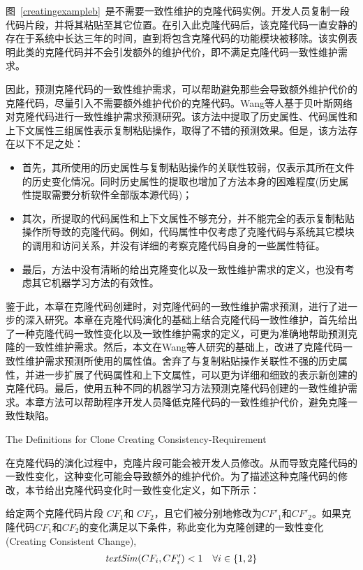 图~\ref{creatingexampleb}~是不需要一致性维护的克隆代码实例。开发人员复制一段代码片段，并将其粘贴至其它位置。在引入此克隆代码后，该克隆代码一直安静的存在于系统中长达三年的时间，直到将包含克隆代码的功能模块被移除。该实例表明此类的克隆代码并不会引发额外的维护代价，即不满足克隆代码一致性维护需求。

因此，预测克隆代码的一致性维护需求，可以帮助避免那些会导致额外维护代价的克隆代码，尽量引入不需要额外维护代价的克隆代码。Wang等人基于贝叶斯网络对克隆代码进行一致性维护需求预测研究\cite{wang2012can}\cite{wang2014predicting}。该方法中提取了历史属性、代码属性和上下文属性三组属性表示复制粘贴操作，取得了不错的预测效果。但是，该方法存在以下不足之处：

\begin{itemize}
\item
首先，其所使用的历史属性与复制粘贴操作的关联性较弱，仅表示其所在文件的历史变化情况。同时历史属性的提取也增加了方法本身的困难程度(历史属性提取需要分析软件全部版本源代码)；
\item
其次，所提取的代码属性和上下文属性不够充分，并不能完全的表示复制粘贴操作所导致的克隆代码。例如，代码属性中仅考虑了克隆代码与系统其它模块的调用和访问关系，并没有详细的考察克隆代码自身的一些属性特征。
\item
最后，方法中没有清晰的给出克隆变化以及一致性维护需求的定义，也没有考虑其它机器学习方法的有效性。
\end{itemize}

鉴于此，本章在克隆代码创建时，对克隆代码的一致性维护需求预测，进行了进一步的深入研究。本章在克隆代码演化的基础上结合克隆代码一致性维护，首先给出了一种克隆代码一致性变化以及一致性维护需求的定义，可更为准确地帮助预测克隆的一致性维护需求。然后，本文在Wang等人研究的基础上，改进了克隆代码一致性维护需求预测所使用的属性值。舍弃了与复制粘贴操作关联性不强的历史属性，并进一步扩展了代码属性和上下文属性，可以更为详细和细致的表示新创建的克隆代码。最后，使用五种不同的机器学习方法预测克隆代码创建的一致性维护需求。本章方法可以帮助程序开发人员降低克隆代码的一致性维护代价，避免克隆一致性缺陷。

{The Definitions for Clone Creating Consistency-Requirement}

在克隆代码的演化过程中，克隆片段可能会被开发人员修改。从而导致克隆代码的一致性变化，这种变化可能会导致额外的维护代价。为了描述这种克隆代码的修改，本节给出克隆代码变化时一致性变化定义，如下所示：

\begin{definition}[克隆创建一致性变化]  
\label{def-creatingchange}
给定两个克隆代码片段 $CF_1$和 $CF_2$，且它们被分别地修改为$CF'_1$和$CF'_2$。如果克隆代码$CF_1$和$CF_2$的变化满足以下条件，称此变化为克隆创建的一致性变化(Creating Consistent Change), 
  \[
  \begin{array}[t]{cr}
    \mathit{textSim}(CF_i, CF'_i) < 1 & \forall i \in \{1,2\}  \\
  \end{array}
  \]
\end{definition}

